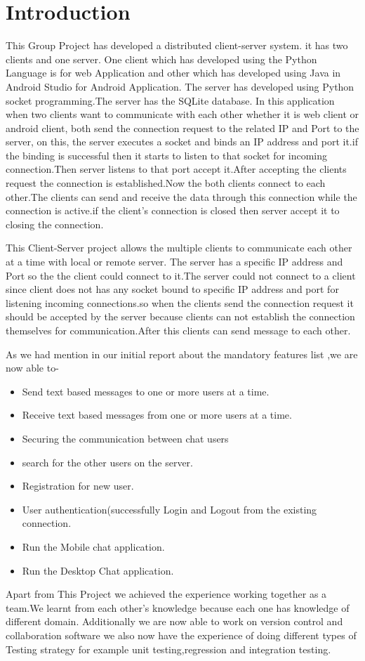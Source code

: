\documentclass[finalReport.tex]{subfiles}
\begin{document}
\chapter{Introduction}
This Group Project has developed a distributed client-server system. it has two clients and one server. One client which has developed using the Python Language is for web Application and other which has developed using Java in Android Studio for Android Application.
The server has developed using Python socket programming.The server has the SQLite database.
In this application when two clients want to communicate with each other whether it is web client or android client, both send the connection request to the related IP and Port to the server, on this, the server executes a socket and binds an IP address and port it.if the binding is successful then it starts to listen to that socket for incoming connection.Then server listens to that port accept it.After accepting the clients request the connection is established.Now the both clients connect to each other.The clients can send and receive the data through this connection while the connection is active.if the client's connection is closed then server accept it to closing the connection.
 
     This Client-Server project allows the multiple clients to communicate each other at a time with local or remote server.
The server has a specific IP address and Port so the the client could connect to it.The server could not connect to a client since client does not has any socket bound to specific IP address and port for listening incoming connections.so when the clients send the connection request it should  be accepted by the server because clients can not establish the connection themselves for communication.After this clients can send message to each other.


     As we had mention in our initial report about the mandatory features list ,we are now able to-
\begin{itemize}
\item Send text based messages to one or more users at a time.
\item Receive text based messages from one or more users at a time.
\item Securing the communication between chat users
\item search for the other users on the server.
\item Registration for new user.
\item User authentication(successfully Login and Logout from the existing connection.
\item Run the Mobile chat application.
\item Run the Desktop Chat application.
\end{itemize}
Apart from This Project we achieved the experience working together as a team.We learnt from each other's knowledge because each one has knowledge of different domain.
Additionally we are now able to work on version control and collaboration software 
we also now have the experience of doing different types of Testing strategy for example unit testing,regression and integration testing.
\end{document}
